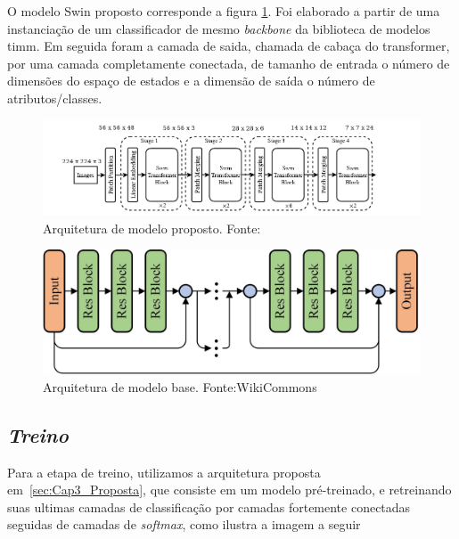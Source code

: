 O modelo Swin proposto corresponde a figura \ref{fig:Swin-T-Rsp}. Foi elaborado a partir de uma instanciação de um classificador de mesmo \textit{backbone} da biblioteca de modelos timm. Em seguida foram a camada de saida, chamada de cabaça do transformer, por uma camada completamente conectada, de tamanho de entrada o número de dimensões do espaço de estados e a dimensão de saída o número de atributos/classes.

\begin{figure}[!ht]
    \centering
    \includegraphics[width=0.9\columnwidth]{Imagens/swin proposto.png}
    \caption{ Arquitetura de modelo proposto.
    Fonte: \cite{liu2022swin}}
   \label{fig:Swin-T-Rsp}
\end{figure}

\begin{figure}[!ht]
    \centering
    \includegraphics[width=0.9\columnwidth]{Imagens/An-illustration-of-the-deep-residual-network-ResNet-structure-More-shortcut.jpg}
    \caption{ Arquitetura de modelo base. Fonte:WikiCommons}
   \label{fig:ResNet-Rsp}
\end{figure}


\subsection{\textit{Treino}}\label{sec:Cap3_Treino}

Para a etapa de treino, utilizamos a arquitetura proposta em~\ref{sec:Cap3_Proposta}, que consiste em um modelo pré-treinado, e retreinando suas ultimas camadas de classificação por camadas fortemente conectadas seguidas de camadas de \textit{softmax}, como ilustra a imagem a seguir


